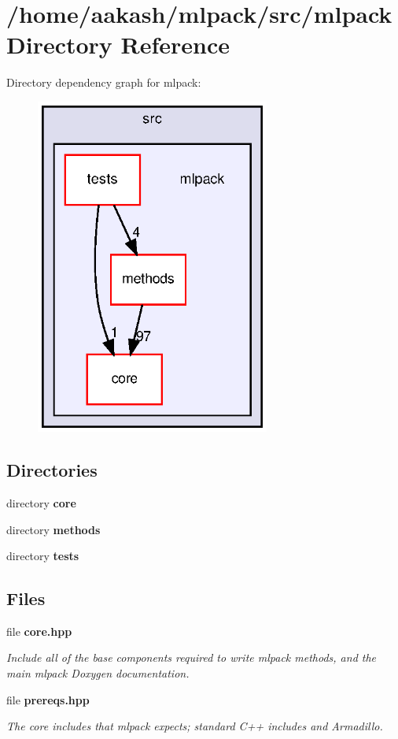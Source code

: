\section{/home/aakash/mlpack/src/mlpack Directory Reference}
\label{dir_44a936ef30fc126706c6284a2fc0c990}
Directory dependency graph for mlpack\+:
\nopagebreak
\begin{figure}[H]
\begin{center}
\leavevmode
\includegraphics[width=218pt]{dir_44a936ef30fc126706c6284a2fc0c990_dep}
\end{center}
\end{figure}
\subsection*{Directories}
\begin{DoxyCompactItemize}
\item 
directory \textbf{ core}
\item 
directory \textbf{ methods}
\item 
directory \textbf{ tests}
\end{DoxyCompactItemize}
\subsection*{Files}
\begin{DoxyCompactItemize}
\item 
file \textbf{ core.\+hpp}
\begin{DoxyCompactList}\small\item\em Include all of the base components required to write mlpack methods, and the main mlpack Doxygen documentation. \end{DoxyCompactList}\item 
file \textbf{ prereqs.\+hpp}
\begin{DoxyCompactList}\small\item\em The core includes that mlpack expects; standard C++ includes and Armadillo. \end{DoxyCompactList}\end{DoxyCompactItemize}
